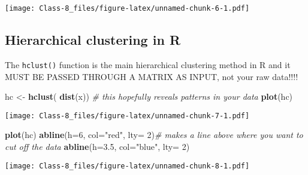 \documentclass[]{article}
\newenvironment{Shaded}{\begin{snugshade}}{\end{snugshade}}
\newcommand{\CommentTok}[1]{\textcolor[rgb]{0.56,0.35,0.01}{\textit{#1}}}
\newcommand{\DataTypeTok}[1]{\textcolor[rgb]{0.13,0.29,0.53}{#1}}
\newcommand{\DecValTok}[1]{\textcolor[rgb]{0.00,0.00,0.81}{#1}}
\newcommand{\FloatTok}[1]{\textcolor[rgb]{0.00,0.00,0.81}{#1}}
\newcommand{\KeywordTok}[1]{\textcolor[rgb]{0.13,0.29,0.53}{\textbf{#1}}}
\newcommand{\NormalTok}[1]{#1}
\newcommand{\OperatorTok}[1]{\textcolor[rgb]{0.81,0.36,0.00}{\textbf{#1}}}
\newcommand{\StringTok}[1]{\textcolor[rgb]{0.31,0.60,0.02}{#1}}
\begin{document}
\begin{Shaded}
\end{Shaded}

\texttt{[image: Class-8\_files/figure-latex/unnamed-chunk-6-1.pdf]}

\hypertarget{hierarchical-clustering-in-r}{%
\subsection{Hierarchical clustering in
R}\label{hierarchical-clustering-in-r}}

The \texttt{hclust()} function is the main hierarchical clustering
method in R and it MUST BE PASSED THROUGH A MATRIX AS INPUT, not your
raw data!!!!

\begin{Shaded}
\begin{Highlighting}[]
\NormalTok{hc <-}\StringTok{ }\KeywordTok{hclust}\NormalTok{( }\KeywordTok{dist}\NormalTok{(x))  }\CommentTok{# this hopefully reveals patterns in your data}
\KeywordTok{plot}\NormalTok{(hc)}
\end{Highlighting}
\end{Shaded}

\texttt{[image: Class-8\_files/figure-latex/unnamed-chunk-7-1.pdf]}

\begin{Shaded}
\begin{Highlighting}[]
\KeywordTok{plot}\NormalTok{(hc)}
\KeywordTok{abline}\NormalTok{(}\DataTypeTok{h=}\DecValTok{6}\NormalTok{, }\DataTypeTok{col=}\StringTok{"red"}\NormalTok{, }\DataTypeTok{lty=} \DecValTok{2}\NormalTok{)}\CommentTok{# makes a line above where you want to cut off the data}
\KeywordTok{abline}\NormalTok{(}\DataTypeTok{h=}\FloatTok{3.5}\NormalTok{, }\DataTypeTok{col=}\StringTok{"blue"}\NormalTok{, }\DataTypeTok{lty=} \DecValTok{2}\NormalTok{)}
\end{Highlighting}
\end{Shaded}

\texttt{[image: Class-8\_files/figure-latex/unnamed-chunk-8-1.pdf]}
\end{document}
